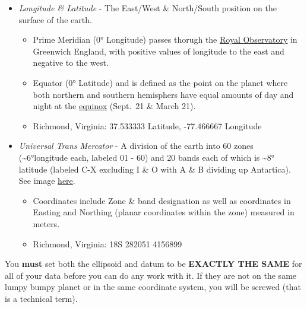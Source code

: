 \documentclass[
  letterpaper,
]{book}
\providecommand{\tightlist}{%
  \setlength{\itemsep}{0pt}\setlength{\parskip}{0pt}}
\begin{document}
\begin{itemize}
\tightlist
\item
  \emph{Longitude \& Latitude} - The East/West \& North/South position
  on the surface of the earth.

  \begin{itemize}
  \tightlist
  \item
    Prime Meridian (0° Longitude) passes thorugh the
    \href{https://en.wikipedia.org/wiki/Royal_Observatory,_Greenwich}{Royal
    Observatory} in Greenwich England, with positive values of longitude
    to the east and negative to the west.
  \item
    Equator (0° Latitude) and is defined as the point on the planet
    where both northern and southern hemisphers have equal amounts of
    day and night at the
    \href{https://en.wikipedia.org/wiki/Equinox}{equinox} (Sept.~21 \&
    March 21).
  \item
    Richmond, Virginia: 37.533333 Latitude, -77.466667 Longitude
  \end{itemize}
\item
  \emph{Universal Trans Mercator} - A division of the earth into 60
  zones (\textasciitilde6°longitude each, labeled 01 - 60) and 20 bands
  each of which is \textasciitilde8° latitude (labeled C-X excluding I
  \& O with A \& B dividing up Antartica). See image
  \href{https://en.wikipedia.org/wiki/Universal_Transverse_Mercator_coordinate_system\#/media/File:Universal_Transverse_Mercator_zones.svg}{here}.

  \begin{itemize}
  \tightlist
  \item
    Coordinates include Zone \& band designation as well as coordinates
    in Easting and Northing (planar coordinates within the zone)
    measured in meters.
  \item
    Richmond, Virginia: 18S 282051 4156899
  \end{itemize}
\end{itemize}

\begin{tcolorbox}[enhanced jigsaw, arc=.35mm, bottomrule=.15mm, bottomtitle=1mm, breakable, colback=white, colbacktitle=quarto-callout-warning-color!10!white, colframe=quarto-callout-warning-color-frame, coltitle=black, left=2mm, leftrule=.75mm, opacityback=0, opacitybacktitle=0.6, rightrule=.15mm, title=\textcolor{quarto-callout-warning-color}{\faExclamationTriangle}\hspace{0.5em}{Important}, titlerule=0mm, toprule=.15mm, toptitle=1mm]

You \textbf{must} set both the ellipsoid and datum to be \textbf{EXACTLY
THE SAME} for all of your data before you can do any work with it. If
they are not on the same lumpy bumpy planet or in the same coordinate
system, you will be screwed (that is a technical term).

\end{tcolorbox}
\end{document}
